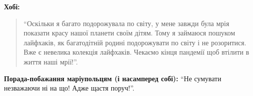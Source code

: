 \textbf{Хобі:} 

\begin{quote}
\enquote{Оскільки я багато подорожувала по світу, у мене завжди була мрія показати
красу нашої планети своїм дітям. Тому я займаюся пошуком лайфхаків, як
багатодітній родині подорожувати по світу і не розоритися. Вже є невелика
колекція лайфхаків. Чекаємо кінця пандемії щоб втілити в життя наші мрії!}.
\end{quote}

\textbf{Порада-побажання маріупольцям (і насамперед собі):} \enquote{Не сумувати незважаючи ні на що! Адже щастя поруч!}.

\endgroup

